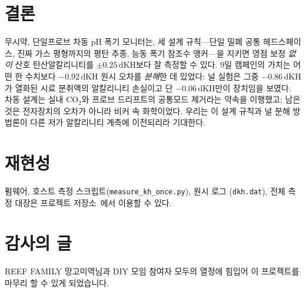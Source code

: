 \documentclass[11pt]{article}
\newcommand{\dkh}{\ensuremath{\,\mathrm{dKH}}}
\newcommand{\co}{\ensuremath{\mathrm{CO_2}}}
\begin{document}
\section{결론}
무시약, 단일프로브 차동 pH 폭기 모니터는, 세 설계 규칙---단일 밀폐 공통 헤드스페이스,
진짜 가스 평형까지의 평탄 추종, 능동 폭기 참조수 앵커---을 지키면 영점 보정 \emph{없이}
산호 탄산알칼리니티를 $\pm0.25\dkh$보다 잘 측정할 수 있다. 9일 캠페인의 가치는 어떤
한 수치보다 $-0.92\dkh$ 원시 오차를 \emph{분해}한 데 있었다: 널 실험은 그중 $-0.86\dkh$가
열화된 시료 분취액의 알칼리니티 손실이고 단 $-0.06\dkh$만이 장치임을 보였다. 차동 설계는
실내 \co{}와 프로브 드리프트의 공통모드 제거라는 약속을 이행했고; 남은 것은 전자장치의
오차가 아니라 비커 속 화학이었다. 우리는 이 설계 규칙과 널 분해 방법론이 다른 저가
알칼리니티 계측에 이전되리라 기대한다.

\section*{재현성}
펌웨어, 호스트 측정 스크립트(\texttt{measure\_kh\_once.py}), 원시 로그
(\texttt{dkh.dat}), 전체 측정 대장은 프로젝트 저장소~\cite{repo}에서 이용할 수 있다.

\section*{감사의 글}
REEF FAMILY 망고미역님과 DIY 모임 참여자 모두의 열정에 힘입어 이 프로젝트를 마무리
할 수 있게 되었습니다.
\end{document}
